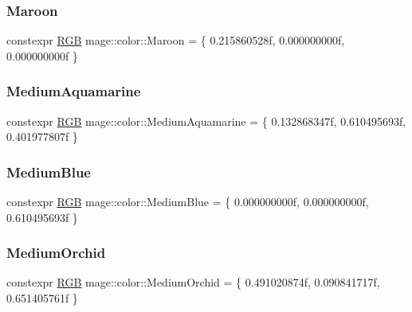 \mbox{\label{namespacemage_1_1color_a6573b86c7e6c8c7cbf76c108a5820259}} 
\subsubsection{\texorpdfstring{Maroon}{Maroon}}
{\footnotesize\ttfamily constexpr \mbox{\hyperlink{structmage_1_1_r_g_b}{R\+GB}} mage\+::color\+::\+Maroon = \{ 0.\+215860528f, 0.\+000000000f, 0.\+000000000f \}}

\mbox{\label{namespacemage_1_1color_a4560188b77c7b4a82162c749b9e4e5f6}} 
\subsubsection{\texorpdfstring{Medium\+Aquamarine}{MediumAquamarine}}
{\footnotesize\ttfamily constexpr \mbox{\hyperlink{structmage_1_1_r_g_b}{R\+GB}} mage\+::color\+::\+Medium\+Aquamarine = \{ 0.\+132868347f, 0.\+610495693f, 0.\+401977807f \}}

\mbox{\label{namespacemage_1_1color_a0be5a1c37d2e0598414235399e0cb6e2}} 
\subsubsection{\texorpdfstring{Medium\+Blue}{MediumBlue}}
{\footnotesize\ttfamily constexpr \mbox{\hyperlink{structmage_1_1_r_g_b}{R\+GB}} mage\+::color\+::\+Medium\+Blue = \{ 0.\+000000000f, 0.\+000000000f, 0.\+610495693f \}}

\mbox{\label{namespacemage_1_1color_a55306d3a39ad61219538ba4527521342}} 
\subsubsection{\texorpdfstring{Medium\+Orchid}{MediumOrchid}}
{\footnotesize\ttfamily constexpr \mbox{\hyperlink{structmage_1_1_r_g_b}{R\+GB}} mage\+::color\+::\+Medium\+Orchid = \{ 0.\+491020874f, 0.\+090841717f, 0.\+651405761f \}}


